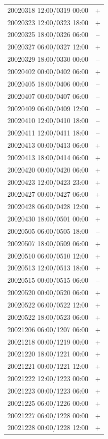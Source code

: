 \documentclass[draft]{agujournal2019}
\begin{document}
\begin{center}
\begin{longtable}{lc}
20020318 12:00/0319 00:00 & + \\
20020323 12:00/0323 18:00 & + \\
20020325 18:00/0326 06:00 & -- \\
20020327 06:00/0327 12:00 & + \\
20020329 18:00/0330 00:00 & -- \\
20020402 00:00/0402 06:00 & + \\
20020405 18:00/0406 00:00 & -- \\
20020407 00:00/0407 06:00 & -- \\
20020409 06:00/0409 12:00 & -- \\
20020410 12:00/0410 18:00 & -- \\
20020411 12:00/0411 18:00 & -- \\
20020413 00:00/0413 06:00 & + \\
20020413 18:00/0414 06:00 & + \\
20020420 00:00/0420 06:00 & + \\
20020423 12:00/0423 23:00 & + \\
20020427 00:00/0427 06:00 & + \\
20020428 06:00/0428 12:00 & + \\
20020430 18:00/0501 00:00 & + \\
20020505 06:00/0505 18:00 & -- \\
20020507 18:00/0509 06:00 & + \\
20020510 06:00/0510 12:00 & + \\
20020513 12:00/0513 18:00 & + \\
20020515 00:00/0515 06:00 & -- \\
20020520 00:00/0520 06:00 & + \\
20020522 06:00/0522 12:00 & + \\
20020522 18:00/0523 06:00 & + \\
20021206 06:00/1207 06:00 & + \\
20021218 00:00/1219 00:00 & + \\
20021220 18:00/1221 00:00 & + \\
20021221 00:00/1221 12:00 & + \\
20021222 12:00/1223 00:00 & + \\
20021223 00:00/1223 06:00 & + \\
20021225 06:00/1226 00:00 & + \\
20021227 06:00/1228 00:00 & + \\
20021228 00:00/1228 12:00 & + \\

\end{longtable}
\end{center}
\end{document}

